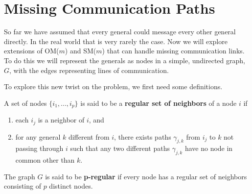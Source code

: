 \documentclass[10pt]{amsart}
\begin{document}
\section{Missing Communication Paths}

So far we have assumed that every general could message every other general directly. In the real 
world that is very rarely the case. Now we will explore extensions of OM($m$) and SM($m$) that can handle missing communication
links. To do this we will represent the generals as nodes in a simple, undirected graph, $G$, with the edges
representing lines of communication. 

To explore this new twist on the problem, we first need some definitions.

 { 
    A set of nodes $\{i_1,...,i_p\}$ is said to be a \textbf{regular set of neighbors} of a node $i$ if 
    \vspace{-10pt}
    \begin{enumerate}[label=\roman*.]
        \item each $i_j$ is a neighbor of $i$, and
        \item {
            for any general $k$ different from $i$, there exists paths $\gamma_{j,k}$ from $i_j$ to $k$ not passing
            through $i$ such that any two different paths $\gamma_{j,k}$ have no node in common other than $k$.
        }
    \end{enumerate}
}

 { 
    The graph $G$ is said to be \textbf{p-regular} if every node has a regular set of neighbors 
    consisting of $p$ distinct nodes.
}
\end{document}
